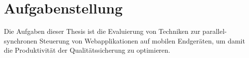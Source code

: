 \documentclass[13pt,a4paper,oneside]{scrbook} %
\newcommand{\tr}[1]{TOREMOVE-->\linebreak{#1} \linebreak <--TOREMOVE}
\renewcommand{\\}{\bigskip}
\begin{document}
\pagestyle{fancy}

\maketitle






\tableofcontents

\listoffigures

\listoftables




\chapter{Aufgabenstellung}
Die Aufgaben dieser Thesis ist die Evaluierung von Techniken zur parallel-synchronen Steuerung von Webapplikationen auf mobilen Endgeräten, um damit die Produktivität der Qualitätssicherung zu optimieren.
\end{document}
